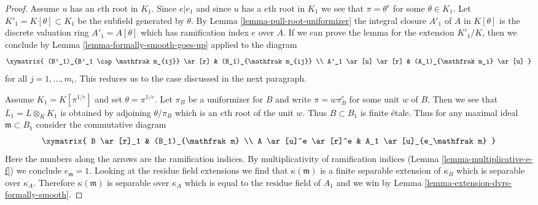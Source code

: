\begin{proof}
\medskip\noindent
Assume $u$ has an $e$th root in $K_1$.
Since $e | e_1$ and since $u$ has a $e$th root in $K_1$
we see that $\pi = \theta^e$ for some $\theta \in K_1$.
Let $K'_1 = K[\theta] \subset K_1$ be the subfield generated by $\theta$.
By Lemma \ref{lemma-pull-root-uniformizer} the integral closure $A'_1$
of $A$ in $K[\theta]$ is the discrete valuation ring $A'_1 = A[\theta]$
which has ramification index $e$ over $A$.
If we can prove the lemma for the extension $K'_1/K$,
then we conclude by Lemma \ref{lemma-formally-smooth-goes-up}
applied to the diagram
$$
\xymatrix{
(B'_1)_{B'_1 \cap \mathfrak m_{ij}} \ar[r] & (B_1)_{\mathfrak m_{ij}} \\
A'_1 \ar[u] \ar[r] &
(A_1)_{\mathfrak m_i} \ar[u]
}
$$
for all $j = 1, \ldots, m_i$. This reduces us to the case discussed
in the next paragraph.

\medskip\noindent
Assume $K_1 = K[\pi^{1/e}]$ and set $\theta = \pi^{1/e}$. Let $\pi_B$ be a
uniformizer for $B$ and write $\pi = w \pi_B^e$ for some unit $w$ of $B$.
Then we see that $L_1 = L \otimes_K K_1$ is obtained by adjoining
$\theta / \pi_B$ which is an $e$th root of the unit $w$. Thus
$B \subset B_1$ is finite \'etale. Thus for any maximal ideal
$\mathfrak m \subset B_1$ consider the commutative diagram
$$
\xymatrix{
B \ar[r]_1 & (B_1)_{\mathfrak m} \\
A \ar[u]^e \ar[r]^e & A_1 \ar[u]_{e_\mathfrak m}
}
$$
Here the numbers along the arrows are the ramification indices.
By multiplicativity of ramification indices
(Lemma \ref{lemma-multiplicative-e-f})
we conclude $e_\mathfrak m = 1$. Looking at the residue field extensions
we find that $\kappa(\mathfrak m)$ is a finite separable extension
of $\kappa_B$ which is separable over $\kappa_A$. Therefore
$\kappa(\mathfrak m)$ is separable over $\kappa_A$
which is equal to the residue field of $A_1$ and we win by
Lemma \ref{lemma-extension-dvrs-formally-smooth}.
\end{proof}
